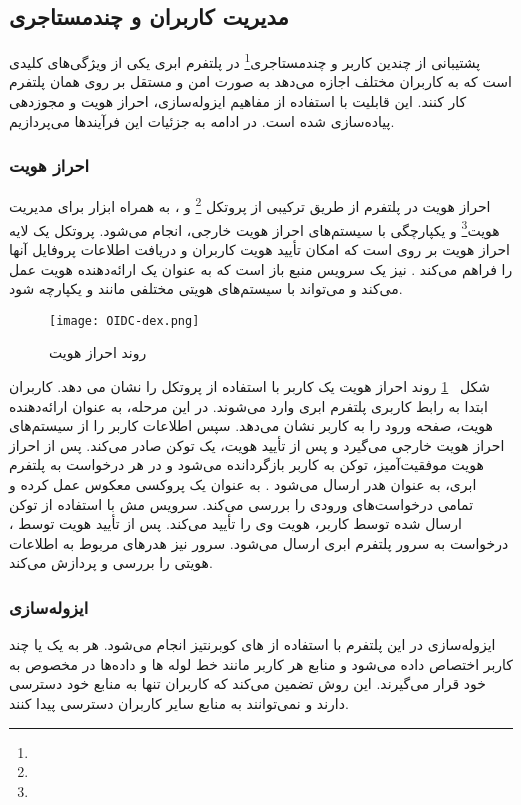 \subsection{مدیریت کاربران و چندمستاجری}
پشتیبانی از چندین کاربر و چندمستاجری\footnote{} در پلتفرم ابری یکی از ویژگی‌های کلیدی است که به کاربران مختلف اجازه می‌دهد به صورت امن و مستقل بر روی همان پلتفرم کار کنند. این قابلیت با استفاده از مفاهیم ایزوله‌سازی، احراز هویت و مجوزدهی پیاده‌سازی شده است. در ادامه به جزئیات این فرآیندها می‌پردازیم.

\subsubsection{احراز هویت}
احراز هویت در پلتفرم از طریق ترکیبی از پروتکل \footnote{}  و ،  به همراه ابزار  برای مدیریت هویت\footnote{} و یکپارچگی با سیستم‌های احراز هویت خارجی، انجام می‌شود. پروتکل  یک لایه احراز هویت بر روی  است که امکان تأیید هویت کاربران و دریافت اطلاعات پروفایل آنها را فراهم می‌کند \cite{OIDC1}.  نیز یک سرویس منبع باز است که به عنوان یک ارائه‌دهنده هویت  عمل می‌کند و می‌تواند با سیستم‌های هویتی مختلفی مانند  و  یکپارچه شود.

\begin{figure}[t]
	\centering
	\texttt{[image: OIDC-dex.png]}
	\caption{روند احراز هویت}
	\label{fig: auth flow}
\end{figure}
شکل 
~\ref{fig: auth flow}
روند احراز هویت یک کاربر با استفاده از پروتکل  را نشان می دهد. کاربران ابتدا به رابط کاربری پلتفرم ابری وارد می‌شوند. در این مرحله،  به عنوان ارائه‌دهنده هویت، صفحه ورود را به کاربر نشان می‌دهد. سپس  اطلاعات کاربر را از سیستم‌های احراز هویت خارجی می‌گیرد و پس از تأیید هویت، یک توکن  صادر می‌کند. پس از احراز هویت موفقیت‌آمیز، توکن  به کاربر بازگردانده می‌شود و در هر درخواست  به پلتفرم ابری، به عنوان هدر  ارسال می‌شود \cite{OIDC1}.  به عنوان یک پروکسی معکوس عمل کرده و تمامی درخواست‌های ورودی را بررسی می‌کند. سرویس مش با استفاده از توکن  ارسال شده توسط کاربر، هویت وی را تأیید می‌کند. پس از تأیید هویت توسط ، درخواست به سرور  پلتفرم ابری ارسال می‌شود. سرور  نیز هدرهای مربوط به اطلاعات هویتی را بررسی و پردازش می‌کند.

\subsubsection{ایزوله‌سازی}
ایزوله‌سازی در این پلتفرم با استفاده از های کوبرنتیز انجام می‌شود. هر  به یک یا چند کاربر اختصاص داده می‌شود و منابع هر کاربر مانند خط لوله ها و داده‌ها در  مخصوص به خود قرار می‌گیرند. این روش تضمین می‌کند که کاربران تنها به منابع خود دسترسی دارند و نمی‌توانند به منابع سایر کاربران دسترسی پیدا کنند.

